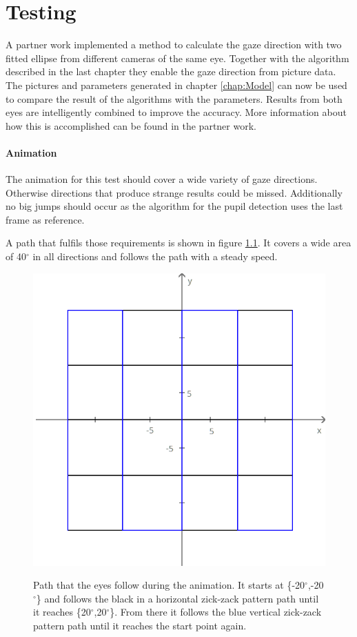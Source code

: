 \chapter{Testing}
\label{chap:results}

A partner work implemented a method to calculate the gaze direction with two fitted ellipse from different cameras of the same eye. Together with the algorithm described in the last chapter they enable the gaze direction from picture data. The pictures and parameters generated in chapter \ref{chap:Model} can now be used to compare the result of the algorithms with the parameters. Results from both eyes are intelligently combined to improve the accuracy. More information about how this is accomplished can be found in the partner work.



\subsubsection{Animation}
\label{sec:animation}

The animation for this test should cover a wide variety of gaze directions. Otherwise directions that produce strange results could be missed. Additionally no big jumps should occur as the algorithm for the pupil detection uses the last frame as reference. 

A path that fulfils those requirements is shown in figure \ref{fig:path}. It covers a wide area of 40$^{\circ}$ in all directions and follows the path with a steady speed.

\begin{figure} [H]
		\centering
		\includegraphics[width=0.4\linewidth]{images/grid.png}
		\label{fig:path}
	
	\caption{Path that the eyes follow during the animation. It starts at \{-20$^{\circ}$,-20$^{\circ}$\} and follows the black in a horizontal zick-zack pattern path until it reaches \{20$^{\circ}$,20$^{\circ}$\}. From there it follows the blue vertical zick-zack pattern path until it reaches the start point again. }	
\end{figure}

